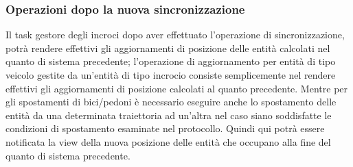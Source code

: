 \subsubsection*{Operazioni dopo la nuova sincronizzazione} 
Il task gestore degli incroci dopo aver effettuato l'operazione di sincronizzazione, potrà rendere effettivi gli aggiornamenti di posizione delle entità calcolati nel quanto di sistema precedente; l'operazione di aggiornamento per entità di tipo veicolo gestite da un'entità di tipo incrocio consiste semplicemente nel rendere effettivi gli aggiornamenti di posizione calcolati al quanto precedente. Mentre per gli spostamenti di bici/pedoni è necessario eseguire anche lo spostamento delle entità da una determinata traiettoria ad un'altra nel caso siano soddisfatte le condizioni di spostamento esaminate nel protocollo. Quindi qui potrà essere notificata la view della nuova posizione delle entità che occupano alla fine del quanto di sistema precedente.  